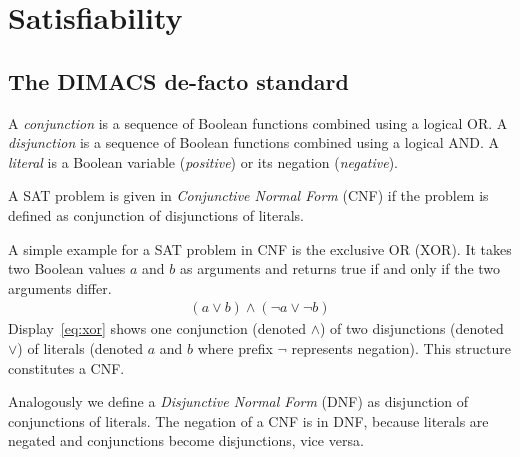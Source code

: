 \renewcommand*\chappic{img/satisfiability.pdf}
\renewcommand*\chapquote{What idiot called them logic errors rather than bool shit?}
\renewcommand*\chapquotesrc{Unknown}
\chapter{Satisfiability}
\label{ch:sat}
\vspace{50pt}

\section{The DIMACS de-facto standard}
\label{sec:sat-dimacs}
%
\begin{defi}
  A \emph{conjunction} is a sequence of Boolean functions combined using
  a logical OR. A \emph{disjunction} is a sequence of Boolean functions
  combined using a logical AND. A \emph{literal} is a Boolean variable
  (\emph{positive}) or its negation (\emph{negative}).

  A SAT problem is given in \emph{Conjunctive Normal Form} (CNF) if
  the problem is defined as conjunction of disjunctions of literals.
\end{defi}

A simple example for a SAT problem in CNF is the exclusive OR (XOR).
It takes two Boolean values $a$ and $b$ as arguments and returns true
if and only if the two arguments differ.
{
\setlength{\abovedisplayskip}{5pt}
\setlength{\belowdisplayskip}{5pt}
\setlength{\abovedisplayshortskip}{0pt}
\setlength{\belowdisplayshortskip}{0pt}
\begin{align} (a \lor b) \land (\neg a \lor \neg b) \label{eq:xor}\end{align}
}
Display~\ref{eq:xor} shows one conjunction (denoted $\land$) of two disjunctions
(denoted $\lor$) of literals (denoted $a$ and $b$ where prefix $\neg$ represents
negation). This structure constitutes a CNF.

Analogously we define a \emph{Disjunctive Normal Form} (DNF) as disjunction
of conjunctions of literals. The negation of a CNF is in DNF, because literals
are negated and conjunctions become disjunctions, vice versa.

